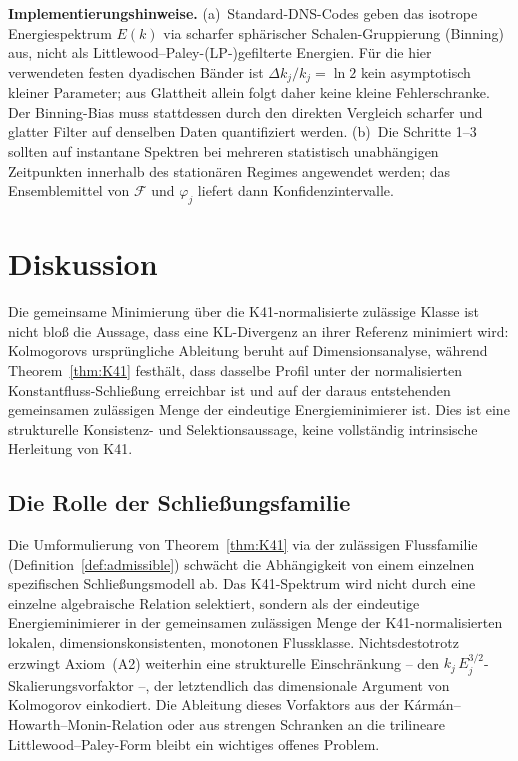 \documentclass[12pt,a4paper]{article}
\theoremstyle{definition}
\theoremstyle{plain}
\theoremstyle{remark}
\begin{document}
\smallskip\noindent
\textbf{Implementierungshinweise.}\;
(a)~Standard-DNS-Codes geben das isotrope Energiespektrum $E(k)$
via scharfer sphärischer Schalen-Gruppierung (Binning) aus, nicht als
Littlewood--Paley-(LP-)gefilterte Energien. Für die hier verwendeten festen
dyadischen Bänder ist $\Delta k_j/k_j=\ln2$ kein asymptotisch kleiner
Parameter; aus Glattheit allein folgt daher keine kleine Fehlerschranke.
Der Binning-Bias muss stattdessen durch den direkten Vergleich scharfer und
glatter Filter auf denselben Daten quantifiziert werden.
(b)~Die Schritte 1--3 sollten auf instantane Spektren bei mehreren
statistisch unabhängigen Zeitpunkten innerhalb des stationären Regimes angewendet werden;
das Ensemblemittel von $\mathcal{F}$ und $\varphi_j$ liefert dann
Konfidenzintervalle.

\section{Diskussion}\label{sec:discussion}

Die gemeinsame Minimierung über die K41-normalisierte zulässige Klasse ist nicht bloß die Aussage, dass eine KL-Divergenz an ihrer Referenz minimiert wird: Kolmogorovs ursprüngliche Ableitung beruht auf Dimensionsanalyse, während Theorem~\ref{thm:K41} festhält, dass dasselbe Profil unter der normalisierten Konstantfluss-Schließung erreichbar ist und auf der daraus entstehenden gemeinsamen zulässigen Menge der eindeutige Energieminimierer ist. Dies ist eine strukturelle Konsistenz- und Selektionsaussage, keine vollständig intrinsische Herleitung von K41.

\subsection{Die Rolle der Schließungsfamilie}

Die Umformulierung von Theorem~\ref{thm:K41} via der zulässigen Flussfamilie (Definition~\ref{def:admissible}) schwächt die Abhängigkeit von einem einzelnen spezifischen Schließungsmodell ab. Das K41-Spektrum wird nicht durch eine einzelne algebraische Relation selektiert, sondern als der eindeutige Energieminimierer in der gemeinsamen zulässigen Menge der K41-normalisierten lokalen, dimensionskonsistenten, monotonen Flussklasse.
Nichtsdestotrotz erzwingt Axiom~(A2) weiterhin eine strukturelle Einschränkung -- den $k_j\,E_j^{3/2}$-Skalierungsvorfaktor --, der letztendlich das dimensionale Argument von Kolmogorov einkodiert. Die Ableitung dieses Vorfaktors aus der Kármán--Howarth--Monin-Relation oder aus strengen Schranken an die trilineare Littlewood--Paley-Form bleibt ein wichtiges offenes Problem.
\end{document}
